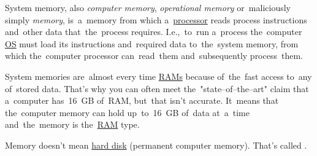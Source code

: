 \label{systemmemory}
System memory, also \textit{computer memory}, \textit{operational memory} or~maliciously simply \textit{memory}, is~a~memory from which a~\hyperref[processorcpucore]{processor} reads process instructions and~other data that~the~process requires.
I.e.,~to~run a~process the~computer \hyperref[os]{OS} must load its instructions and~required data to~the~system memory, from which the~computer processor can~read~them and~subsequently process~them.

System memories are~almost every time \hyperref[ram]{RAMs} because of~the~fast access to~any of~stored data.
That's why you can often meet the~"state--of--the--art" claim that a~computer has~16~GB of~RAM, but~that isn't accurate.
It~means that the~computer memory can hold up~to~16~GB of~data at~a~time and~the~memory is the~\hyperref[ram]{RAM} type.

\warning Memory doesn't mean \hyperref[harddiskdrive]{hard disk} (permanent computer memory).
That's called \hyperref[harddiskdrive]{}.
\newpage
